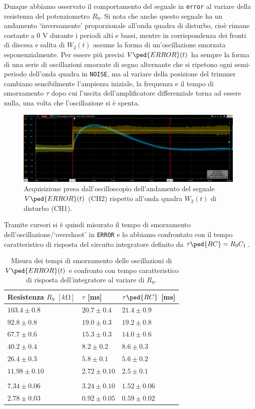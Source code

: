 \documentclass[10pt, a4paper, italian]{article}
\begin{document}
Dunque abbiamo osservato il comportamento del segnale in \verb+error+ al
variare della resistenza del potenziometro $R_9$. Si nota che anche questo
segnale ha un andamento `inversamente' proporzionale all'onda quadra di
disturbo, cioè rimane costante a $0$ V durante i periodi alti e bassi, mentre
in corrispondenza dei fronti di discesa e salita di $W_2 (t)$ assume la forma
di un'oscillazione smorzata esponenzialmente. Per essere più precisi
$V\ped{ERROR} (t)$ ha sempre la forma di una serie di oscillazioni smorzate di
segno alternante che si ripetono ogni semi-periodo dell'onda quadra in
\verb+NOISE+, ma al variare della posizione del trimmer cambiano sensibilmente
l'ampiezza iniziale, la frequenza e il tempo di smorzamento $\tau$ dopo cui
l'uscita dell'amplificatore differenziale torna ad essere nulla, una volta che
l'oscillazione si è spenta.
\begin{figure}[htbp]
    \centering
	\includegraphics[width=\textwidth]{7}
    \caption{Acquisizione presa dall'oscilloscopio dell'andamento del segnale
    $V\ped{ERROR} (t)$ (CH2) rispetto all'onda quadra $W_2 (t)$ di disturbo
    (CH1).
    \label{fig: errnoise}}
\end{figure}

Tramite cursori si è quindi misurato il tempo di smorzamento
dell'oscillazione/`overshoot' in \verb+ERROR+ e lo abbiamo confrontato con il
tempo caratteristico di risposta del circuito integratore definito da
$\tau\ped{RC} = R_9 C_1$.
\begin{table}[htbp]
\centering
\begin{tabular}{@{}lll@{}}
\toprule
Resistenza $R_9$ $[\si{k\ohm}]$ & $\tau$ [ms] & $\tau\ped{RC}$ [ms] \\
\midrule
\midrule
$103.4 \pm 0.8 $ & $20.7 \pm 0.4$ & $ 21.4 \pm 0.9$ \\
$92.8 \pm 0.8$	& $19.0 \pm 0.3$ & $ 19.2 \pm 0.8 $ \\
$67.7 \pm 0.6$	& $15.3 \pm 0.3$ & $ 14.0 \pm 0.6 $ \\
$40.2 \pm 0.4$	& $8.2 \pm 0.2$ & $ 8.6 \pm 0.3 $ \\
$26.4 \pm 0.3$	& $5.8 \pm 0.1$ & $ 5.6 \pm 0.2 $ \\
$11.98 \pm 0.10$ & $2.72 \pm 0.10$ & $2.5 \pm 0.1$ \\
\\
$7.34 \pm 0.06$ & $3.24 \pm 0.10$ & $ 1.52 \pm 0.06$ \\
$2.78 \pm 0.03$ & $0.92 \pm 0.05$ & $ 0.59 \pm 0.02$ \\
\bottomrule
\end{tabular}
\caption{Misura dei tempi di smorzamento delle oscillazioni
di $V\ped{ERROR} (t)$ e confronto con tempo caratteristico di risposta
dell'integratore al variare di $R_9$.}
\end{table}
\end{document}
